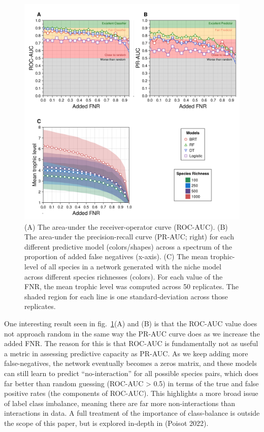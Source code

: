 \documentclass[10pt,oneside]{article}
\makeatletter
\def\maxwidth{\ifdim\Gin@nat@width>\linewidth\linewidth
\else\Gin@nat@width\fi}
\let\Oldincludegraphics\includegraphics
\renewcommand{\includegraphics}[1]{\Oldincludegraphics[width=\maxwidth]{#1}}
\makeatother
\begin{document}
\begin{figure}
\hypertarget{fig:addedfnr}{%
\centering
\includegraphics{./figures/fig3.png}
\caption{(A) The area-under the receiver-operator curve (ROC-AUC). (B)
The area-under the precision-recall curve (PR-AUC; right) for each
different predictive model (colors/shapes) across a spectrum of the
proportion of added false negatives (x-axis). (C) The mean trophic-level
of all species in a network generated with the niche model across
different species richnesses (colors). For each value of the FNR, the
mean trophic level was computed across 50 replicates. The shaded region
for each line is one standard-deviation across those
replicates.}\label{fig:addedfnr}
}
\end{figure}

One interesting result seen in fig.~\ref{fig:addedfnr}(A) and (B) is
that the ROC-AUC value does not approach random in the same way the
PR-AUC curve does as we increase the added FNR. The reason for this is
that ROC-AUC is fundamentally not as useful a metric in assessing
predictive capacity as PR-AUC. As we keep adding more false-negatives,
the network eventually becomes a zeros matrix, and these models can
still learn to predict ``no-interaction'' for all possible species
pairs, which does far better than random guessing (ROC-AUC
\textgreater{} 0.5) in terms of the true and false positive rates (the
components of ROC-AUC). This highlights a more broad issue of label
class imbalance, meaning there are far more non-interactions than
interactions in data. A full treatment of the importance of
class-balance is outside the scope of this paper, but is explored
in-depth in (Poisot 2022).
\end{document}
